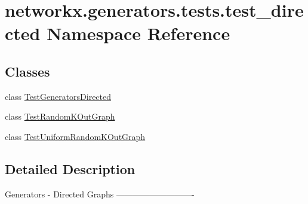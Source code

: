 \hypertarget{namespacenetworkx_1_1generators_1_1tests_1_1test__directed}{}\section{networkx.\+generators.\+tests.\+test\+\_\+directed Namespace Reference}
\label{namespacenetworkx_1_1generators_1_1tests_1_1test__directed}
\subsection*{Classes}
\begin{DoxyCompactItemize}
\item 
class \hyperlink{classnetworkx_1_1generators_1_1tests_1_1test__directed_1_1TestGeneratorsDirected}{Test\+Generators\+Directed}
\item 
class \hyperlink{classnetworkx_1_1generators_1_1tests_1_1test__directed_1_1TestRandomKOutGraph}{Test\+Random\+K\+Out\+Graph}
\item 
class \hyperlink{classnetworkx_1_1generators_1_1tests_1_1test__directed_1_1TestUniformRandomKOutGraph}{Test\+Uniform\+Random\+K\+Out\+Graph}
\end{DoxyCompactItemize}


\subsection{Detailed Description}
\begin{DoxyVerb}Generators - Directed Graphs
----------------------------
\end{DoxyVerb}
 
